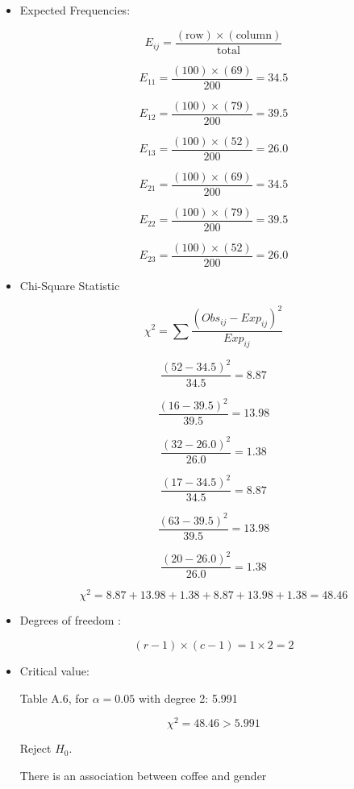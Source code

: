 \documentclass[12pt]{article}
\begin{document}
\begin{itemize}

    \item[] Expected Frequencies:

    \[ E_{ij} = \frac{(\text{row}) \times (\text{column})}{\text{total}} \]


  \[ E_{11} = \frac{(100) \times (69)}{200} = 34.5 \]

  \[ E_{12} = \frac{(100) \times (79)}{200} = 39.5 \]

  \[ E_{13} = \frac{(100) \times (52)}{200} = 26.0 \]

  \[ E_{21} = \frac{(100) \times (69)}{200} = 34.5 \]

  \[ E_{22} = \frac{(100) \times (79)}{200} = 39.5 \]

  \[ E_{23} = \frac{(100) \times (52)}{200} = 26.0 \]

\item[] Chi-Square Statistic


\[ \chi^2 = \sum \frac{(Obs_{ij} - Exp_{ij})^2}{Exp_{ij}} \]

  \[
  \frac{(52 - 34.5)^2}{34.5} = 8.87
  \]


  \[
  \frac{(16 - 39.5)^2}{39.5} = 13.98
  \]


  \[
  \frac{(32 - 26.0)^2}{26.0} = 1.38
  \]


  \[
  \frac{(17 - 34.5)^2}{34.5} = 8.87
  \]


  \[
  \frac{(63 - 39.5)^2}{39.5} = 13.98
  \]


  \[
  \frac{(20 - 26.0)^2}{26.0} = 1.38
  \]


\[
\chi^2 = 8.87 + 13.98 + 1.38 + 8.87 + 13.98 + 1.38 = 48.46
\]



\item[] Degrees of freedom :

\[
    (r - 1) \times (c - 1) = 1 \times 2 = 2
\]


\item[] Critical value:

Table A.6, for \(\alpha = 0.05\) with degree 2: 5.991

  \[
  \chi^2 = 48.46 > 5.991
  \]

Reject \(H_0\).

There is an association between coffee and gender



\end{itemize}
\end{document}
